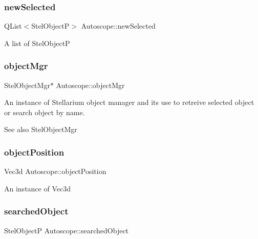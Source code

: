 \subsubsection{\texorpdfstring{newSelected}{newSelected}}
{\footnotesize\ttfamily Q\+List$<$Stel\+ObjectP$>$ Autoscope\+::new\+Selected\hspace{0.3cm}{\ttfamily [private]}}

A list of Stel\+ObjectP \mbox{\label{class_autoscope_aec2c452e45c0a7d045417a8656aa7c45}} 
\subsubsection{\texorpdfstring{objectMgr}{objectMgr}}
{\footnotesize\ttfamily Stel\+Object\+Mgr$\ast$ Autoscope\+::object\+Mgr}



An instance of Stellarium object manager and it\textquotesingle{}s use to retreive selected object or search object by name. 

\begin{DoxySeeAlso}{See also}
Stel\+Object\+Mgr 
\end{DoxySeeAlso}
\mbox{\label{class_autoscope_aff4d8365cc96689c79f3370ebde45b9e}} 
\subsubsection{\texorpdfstring{objectPosition}{objectPosition}}
{\footnotesize\ttfamily Vec3d Autoscope\+::object\+Position\hspace{0.3cm}{\ttfamily [private]}}

An instance of Vec3d \mbox{\label{class_autoscope_aba59abee95b4b5443709dce1d61a3498}} 
\subsubsection{\texorpdfstring{searchedObject}{searchedObject}}
{\footnotesize\ttfamily Stel\+ObjectP Autoscope\+::searched\+Object\hspace{0.3cm}{\ttfamily [private]}}

